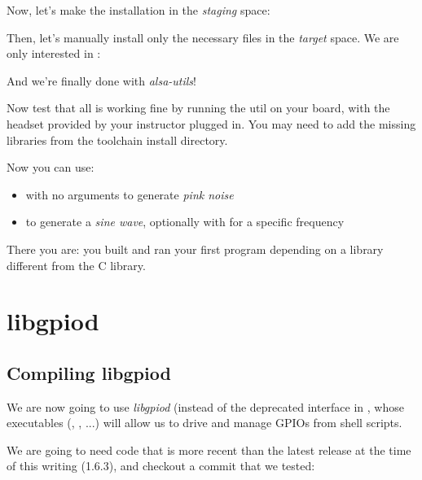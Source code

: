 Now, let's make the installation in the {\em staging} space:


Then, let's manually install only the necessary files in the {\em target}
space. We are only interested in :


And we're finally done with {\em alsa-utils}!

Now test that all is working fine by running the  util on
your board, with the headset provided by your instructor plugged
in. You may need to add the missing libraries from the toolchain
install directory.

Now you can use:

\begin{itemize}

\item {} with no arguments to generate {\em pink noise}

\item {} to generate a {\em sine wave},
optionally with  for a specific frequency

\end{itemize}

There you are: you built and ran your first program depending
on a library different from the C library.

\section{libgpiod}

\subsection{Compiling libgpiod}

We are now going to use {\em libgpiod} (instead of the
deprecated interface in , whose executables
(, , ...) will
allow us to drive and manage GPIOs from shell scripts.

We are going to need code that is more recent than the
latest release at the time of this writing (1.6.3), and
checkout a commit that we tested:

